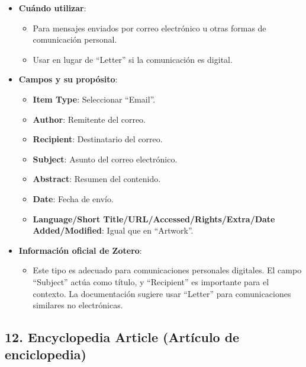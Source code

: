 \documentclass[
  jou,
  floatsintext,
  longtable,
  a4paper,
  nolmodern,
  notxfonts,
  notimes,
  colorlinks=true,linkcolor=blue,citecolor=blue,urlcolor=blue]{apa7}
\providecommand{\tightlist}{%
  \setlength{\itemsep}{0pt}\setlength{\parskip}{0pt}}
\begin{document}
\begin{itemize}
\tightlist
\item
  \textbf{Cuándo utilizar}:

  \begin{itemize}
  \tightlist
  \item
    Para mensajes enviados por correo electrónico u otras formas de
    comunicación personal.
  \item
    Usar en lugar de ``Letter'' si la comunicación es digital.
  \end{itemize}
\item
  \textbf{Campos y su propósito}:

  \begin{itemize}
  \tightlist
  \item
    \textbf{Item Type}: Seleccionar ``Email''.
  \item
    \textbf{Author}: Remitente del correo.
  \item
    \textbf{Recipient}: Destinatario del correo.
  \item
    \textbf{Subject}: Asunto del correo electrónico.
  \item
    \textbf{Abstract}: Resumen del contenido.
  \item
    \textbf{Date}: Fecha de envío.
  \item
    \textbf{Language/Short Title/URL/Accessed/Rights/Extra/Date
    Added/Modified}: Igual que en ``Artwork''.
  \end{itemize}
\item
  \textbf{Información oficial de Zotero}:

  \begin{itemize}
  \tightlist
  \item
    Este tipo es adecuado para comunicaciones personales digitales. El
    campo ``Subject'' actúa como título, y ``Recipient'' es importante
    para el contexto. La documentación sugiere usar ``Letter'' para
    comunicaciones similares no electrónicas.
  \end{itemize}
\end{itemize}

\subsection{12. Encyclopedia Article (Artículo de
enciclopedia)}\label{encyclopedia-article-artuxedculo-de-enciclopedia}
\end{document}
